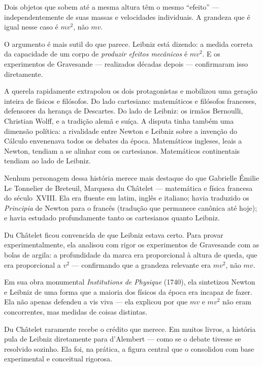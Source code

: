 Dois objetos que sobem até a mesma altura têm o mesmo ``efeito'' — independentemente
de suas massas e velocidades individuais. A grandeza que é igual nesse caso é $mv^2$,
não $mv$.
 
O argumento é mais sutil do que parece. Leibniz está dizendo: a medida correta da
capacidade de um corpo de \textit{produzir efeitos mecânicos} é $mv^2$. E os
experimentos de Gravesande — realizados décadas depois — confirmaram isso
diretamente.
 
\medskip

A querela rapidamente extrapolou os dois protagonistas e mobilizou uma geração inteira
de físicos e filósofos. Do lado cartesiano: matemáticos e filósofos franceses,
defensores da herança de Descartes. Do lado de Leibniz: os irmãos Bernoulli,
Christian Wolff, e a tradição alemã e suíça. A disputa tinha também uma dimensão política: a rivalidade entre Newton e Leibniz
sobre a invenção do Cálculo envenenava todos os debates da época. Matemáticos ingleses,
leais a Newton, tendiam a se alinhar com os cartesianos. Matemáticos continentais
tendiam ao lado de Leibniz. 
 
\medskip

Nenhum personagem dessa história merece mais destaque do que Gabrielle Émilie
Le Tonnelier de Breteuil, Marquesa du Châtelet — matemática e física francesa do
século~XVIII. Ela era fluente em latim, inglês e italiano; havia traduzido os
\textit{Principia} de Newton para o francês (tradução que permanece canônica até hoje);
e havia estudado profundamente tanto os cartesianos quanto Leibniz.
 
Du Châtelet ficou convencida de que Leibniz estava certo. Para provar
experimentalmente, ela analisou com rigor os experimentos de Gravesande
com as bolas de argila: a profundidade da marca era proporcional à altura de queda,
que era proporcional a $v^2$ — confirmando que a grandeza relevante era $mv^2$,
não $mv$.
 
Em sua obra monumental \textit{Institutions de Physique} (1740), ela sintetizou Newton
e Leibniz de uma forma que a maioria dos físicos da época era incapaz de fazer. Ela não
apenas defendeu a vis viva — ela explicou por que $mv$ e $mv^2$ não eram
concorrentes, mas medidas de coisas distintas.
 
Du Châtelet raramente recebe o crédito que merece. Em muitos livros, a história pula
de Leibniz diretamente para d'Alembert — como se o debate tivesse se resolvido sozinho.
Ela foi, na prática, a figura central que o consolidou com base experimental e
conceitual rigorosa.
 
